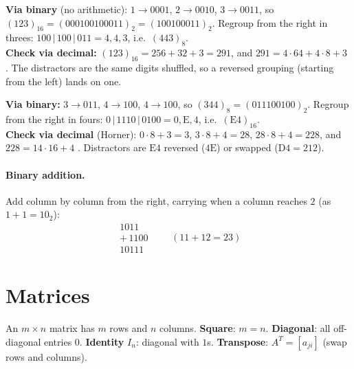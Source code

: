 \documentclass{fkt-notes}
\newcommand{\src}[1]{\par\noindent{\small\itshape Source: #1}\par\smallskip}
\newcommand{\kolman}[1]{\setcounter{section}{\numexpr#1-1\relax}}
\theoremstyle{definition}
\begin{document}
\begin{example}
  \textbf{Via binary} (no arithmetic): $1\to0001$, $2\to0010$, $3\to0011$,
  so $(123)_{16}=(000100100011)_2=(100100011)_2$. Regroup from the right in
  threes: $100\,|\,100\,|\,011 = 4,4,3$, i.e.\ $(443)_8$.\\
  \textbf{Check via decimal:} $(123)_{16}=256+32+3=291$, and
  $291=4\cdot64+4\cdot8+3$ \checkmark. The distractors are the same digits
  shuffled, so a reversed grouping (starting from the left) lands on one.
\end{example}

\begin{example}
  \textbf{Via binary:} $3\to011$, $4\to100$, $4\to100$, so
  $(344)_8=(011100100)_2$. Regroup from the right in fours:
  $0\,|\,1110\,|\,0100 = 0,\mathrm{E},4$, i.e.\ $(\mathrm{E4})_{16}$.\\
  \textbf{Check via decimal} (Horner): $0\cdot8+3=3$, $3\cdot8+4=28$,
  $28\cdot8+4=228$, and $228=14\cdot16+4$ \checkmark. Distractors are
  $\mathrm{E4}$ reversed ($4\mathrm{E}$) or swapped ($\mathrm{D4}=212$).
\end{example}

\paragraph{Binary addition.} Add column by column from the right, carrying
when a column reaches $2$ (as $1+1=10_2$):
\[
  \begin{array}{r}
    1011 \\ {+}\,1100\\\hline 10111
  \end{array}
  \qquad(11+12=23)
\]


\kolman{5}
\section{Matrices}\src{Kolman 1.5}
%

An $m\times n$ matrix has $m$ rows and $n$ columns. \textbf{Square}:
$m=n$. \textbf{Diagonal}: all off-diagonal entries $0$. \textbf{Identity}
$I_n$: diagonal with $1$s. \textbf{Transpose}: $A^{T}=[a_{ji}]$ (swap
rows and columns).
\end{document}
